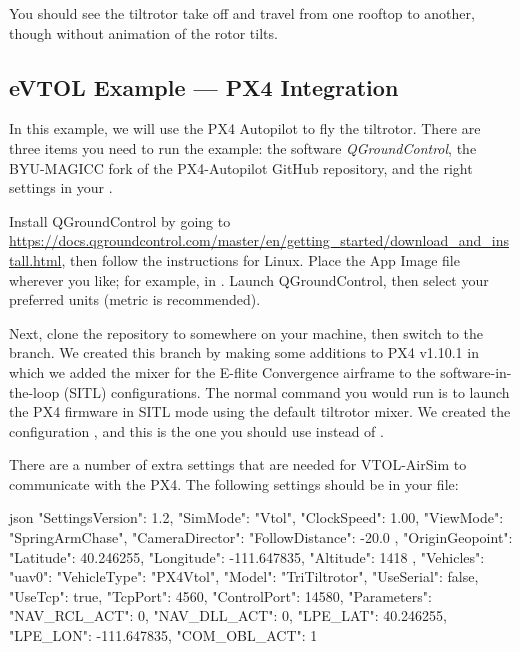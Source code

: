 You should see the tiltrotor take off and travel from one rooftop to another, though without animation of the rotor tilts.

\subsection{eVTOL Example --- PX4 Integration}\label{sec:vtol_px4}
In this example, we will use the PX4 Autopilot to fly the tiltrotor. There are three items you need to run the example: the software \textit{QGroundControl}, the BYU-MAGICC fork of the PX4-Autopilot GitHub repository, and the right settings in your .

Install QGroundControl by going to \url{https://docs.qgroundcontrol.com/master/en/getting_started/download_and_install.html}, then follow the instructions for Linux. Place the App Image file wherever you like; for example, in . Launch QGroundControl, then select your preferred units (metric is recommended).

Next, clone the  repository to somewhere on your machine, then switch to the  branch. We created this branch by making some additions to PX4 v1.10.1 in which we added the mixer for the E-flite Convergence airframe to the software-in-the-loop (SITL) configurations. The normal command you would run is  to launch the PX4 firmware in SITL mode using the default tiltrotor mixer. We created the configuration , and this is the one you should use instead of .

There are a number of extra settings that are needed for VTOL-AirSim to communicate with the PX4. The following settings should be in your  file:
\begin{minttcb}[title={Settings for VTOL-AirSim With PX4}]{json}
{
  "SettingsVersion": 1.2,
  "SimMode": "Vtol",
  "ClockSpeed": 1.00,
  "ViewMode": "SpringArmChase",
  "CameraDirector": {
      "FollowDistance": -20.0
  },
  "OriginGeopoint": {
    "Latitude": 40.246255,
    "Longitude": -111.647835,
    "Altitude": 1418
  },
  "Vehicles": {
    "uav0": {
      "VehicleType": "PX4Vtol",
      "Model": "TriTiltrotor",
      "UseSerial": false,
      "UseTcp": true,
      "TcpPort": 4560,
      "ControlPort": 14580,
      "Parameters": {
        "NAV_RCL_ACT": 0,
        "NAV_DLL_ACT": 0,
        "LPE_LAT": 40.246255,
        "LPE_LON": -111.647835,
        "COM_OBL_ACT": 1
      }
    }
  }
}
\end{minttcb}


